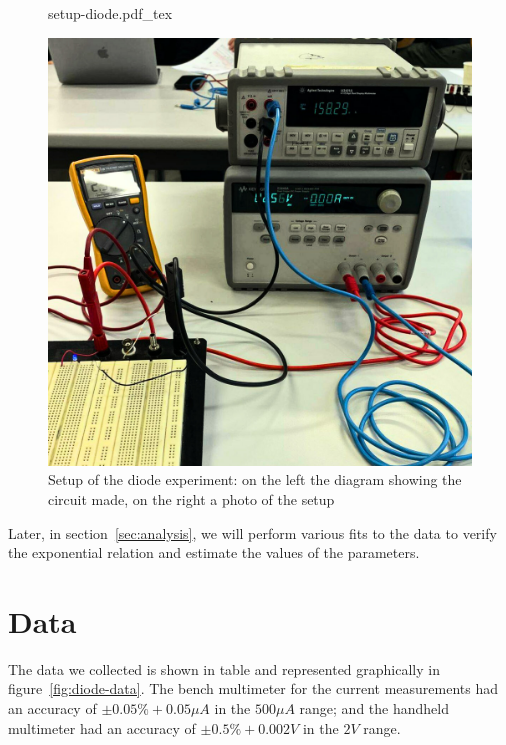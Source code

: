 \documentclass[notitlepage]{report}
\newcommand{\incfig}[2][1]{%
    \def\svgwidth{#1\columnwidth}
    {#2.pdf_tex}
}
\numberwithin{equation}{section}
\theoremstyle{plain}
\theoremstyle{definition}
\theoremstyle{remark}
\begin{document}
\begin{figure}[ht]
    \centering
    \incfig[.45]{setup-diode}
    \includegraphics[width=.45\textwidth]{figures/setup.png}
    \caption{Setup of the diode experiment: on the left the diagram showing
    the circuit made, on the right a photo of the setup}\label{fig:setup-diode}
\end{figure}

Later, in section~\ref{sec:analysis}, we will perform various fits to the data to
verify the exponential relation and estimate the values of the parameters.

\section{Data}\label{sec:data}
The data we collected is shown in table and represented graphically in
figure~\ref{fig:diode-data}. The bench multimeter for the current measurements
had an accuracy of \(\pm 0.05\% + 0.05\mu A\) in the \(500 \mu A\) range; and
the handheld multimeter had an accuracy of \(\pm 0.5\% + 0.002V\) in the \(2 V\)
range.
\end{document}
